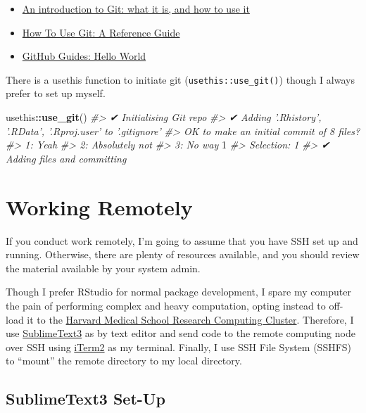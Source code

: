 \documentclass[]{book}
\newenvironment{Shaded}{\begin{snugshade}}{\end{snugshade}}
\newcommand{\KeywordTok}[1]{\textcolor[rgb]{0.13,0.29,0.53}{\textbf{#1}}}
\newcommand{\DecValTok}[1]{\textcolor[rgb]{0.00,0.00,0.81}{#1}}
\newcommand{\CommentTok}[1]{\textcolor[rgb]{0.56,0.35,0.01}{\textit{#1}}}
\newcommand{\OperatorTok}[1]{\textcolor[rgb]{0.81,0.36,0.00}{\textbf{#1}}}
\newcommand{\NormalTok}[1]{#1}
\providecommand{\tightlist}{%
  \setlength{\itemsep}{0pt}\setlength{\parskip}{0pt}}
\begin{document}
\begin{itemize}
\tightlist
\item
  \href{https://medium.freecodecamp.org/what-is-git-and-how-to-use-it-c341b049ae61}{An
  introduction to Git: what it is, and how to use it}
\item
  \href{https://www.digitalocean.com/community/tutorials/how-to-use-git-a-reference-guide}{How
  To Use Git: A Reference Guide}
\item
  \href{https://guides.github.com/activities/hello-world/}{GitHub
  Guides: Hello World}
\end{itemize}

There is a usethis function to initiate git
(\texttt{usethis::use\_git()}) though I always prefer to set up myself.

\begin{Shaded}
\begin{Highlighting}[]
\NormalTok{usethis}\OperatorTok{::}\KeywordTok{use_git}\NormalTok{()}
\CommentTok{#> ✔ Initialising Git repo}
\CommentTok{#> ✔ Adding '.Rhistory', '.RData', '.Rproj.user' to '.gitignore'}
\CommentTok{#> OK to make an initial commit of 8 files?}
\CommentTok{#> 1: Yeah}
\CommentTok{#> 2: Absolutely not}
\CommentTok{#> 3: No way}
\DecValTok{1}
\CommentTok{#> Selection: 1}
\CommentTok{#> ✔ Adding files and committing}
\end{Highlighting}
\end{Shaded}

\section{Working Remotely}\label{working-remotely}

If you conduct work remotely, I'm going to assume that you have SSH set
up and running. Otherwise, there are plenty of resources available, and
you should review the material available by your system admin.

Though I prefer RStudio for normal package development, I spare my
computer the pain of performing complex and heavy computation, opting
instead to off-load it to the \href{https://rc.hms.harvard.edu}{Harvard
Medical School Research Computing Cluster}. Therefore, I use
\href{https://www.sublimetext.com}{SublimeText3} as by text editor and
send code to the remote computing node over SSH using
\href{https://iterm2colorschemes.com}{iTerm2} as my terminal. Finally, I
use SSH File System (SSHFS) to ``mount'' the remote directory to my
local directory.

\subsection{SublimeText3 Set-Up}\label{sublimetext3-set-up}
\end{document}
